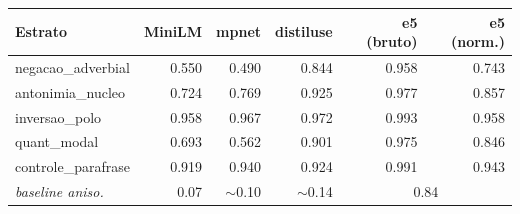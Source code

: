 \begin{tabular}{lrrrrr}
\toprule
Estrato & MiniLM & mpnet & distiluse & e5 (bruto) & e5 (norm.) \\
\midrule
negacao\_adverbial & 0.550 & 0.490 & 0.844 & 0.958 & 0.743 \\
antonimia\_nucleo & 0.724 & 0.769 & 0.925 & 0.977 & 0.857 \\
inversao\_polo & 0.958 & 0.967 & 0.972 & 0.993 & 0.958 \\
quant\_modal & 0.693 & 0.562 & 0.901 & 0.975 & 0.846 \\
controle\_parafrase & 0.919 & 0.940 & 0.924 & 0.991 & 0.943 \\
\midrule
\textit{baseline aniso.} & 0.07 & $\sim$0.10 & $\sim$0.14 & \multicolumn{2}{c}{0.84} \\
\bottomrule
\end{tabular}
